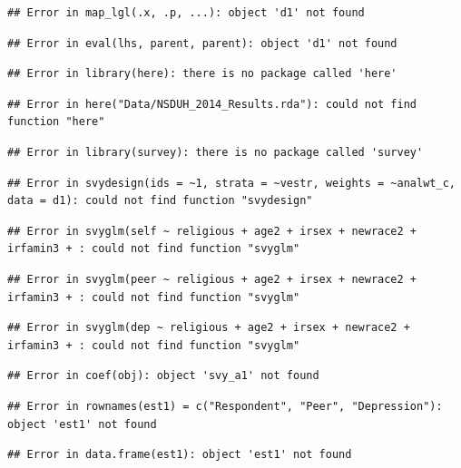 \documentclass[]{DissertateUSU}
\begin{document}
\begin{verbatim}
## Error in map_lgl(.x, .p, ...): object 'd1' not found
\end{verbatim}

\begin{verbatim}
## Error in eval(lhs, parent, parent): object 'd1' not found
\end{verbatim}

\begin{verbatim}
## Error in library(here): there is no package called 'here'
\end{verbatim}

\begin{verbatim}
## Error in here("Data/NSDUH_2014_Results.rda"): could not find function "here"
\end{verbatim}

\begin{verbatim}
## Error in library(survey): there is no package called 'survey'
\end{verbatim}

\begin{verbatim}
## Error in svydesign(ids = ~1, strata = ~vestr, weights = ~analwt_c, data = d1): could not find function "svydesign"
\end{verbatim}

\begin{verbatim}
## Error in svyglm(self ~ religious + age2 + irsex + newrace2 + irfamin3 + : could not find function "svyglm"
\end{verbatim}

\begin{verbatim}
## Error in svyglm(peer ~ religious + age2 + irsex + newrace2 + irfamin3 + : could not find function "svyglm"
\end{verbatim}

\begin{verbatim}
## Error in svyglm(dep ~ religious + age2 + irsex + newrace2 + irfamin3 + : could not find function "svyglm"
\end{verbatim}

\begin{verbatim}
## Error in coef(obj): object 'svy_a1' not found
\end{verbatim}

\begin{verbatim}
## Error in rownames(est1) = c("Respondent", "Peer", "Depression"): object 'est1' not found
\end{verbatim}

\begin{verbatim}
## Error in data.frame(est1): object 'est1' not found
\end{verbatim}
\end{document}
